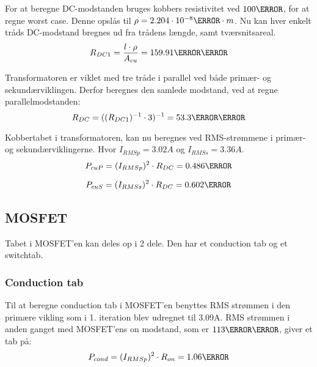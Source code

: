 For at beregne DC-modstanden bruges kobbers resistivitet ved $100\degreeCelsius$, for at regne worst case. Denne opslås til $\rho=2.204\cdot 10^{-8}\ohm \cdot m$. Nu kan hver enkelt tråds DC-modstand bregnes ud fra trådens længde, samt tværsnitsareal.
\begin{equation} \label{dc1-modstand}
R_{DC1} = \frac{l \cdot \rho}{A_{cu}} = 159.91\milli\ohm
\end{equation}

Transformatoren er viklet med tre tråde i parallel ved både primær- og sekundærviklingen. Derfor beregnes den samlede modstand, ved at regne parallelmodstanden:
\begin{equation} \label{dc-modstand}
R_{DC} = ((R_{DC1})^{-1} \cdot 3)^{-1} = 53.3\milli\ohm
\end{equation}

Kobbertabet i transformatoren, kan nu beregnes ved RMS-strømmene i primær- og sekundærviklingerne. Hvor $I_{RMSp} = 3.02A$ og $I_{RMSs} = 3.36A$.
\begin{equation} \label{dc-tab-pri}
P_{cuP} = (I_{RMSp})^2 \cdot R_{DC} = 0.486\watt
\end{equation}

\begin{equation} \label{dc-tab-sek}
P_{cuS} = (I_{RMSs})^2 \cdot R_{DC} = 0.602\watt
\end{equation}

\subsection{MOSFET}
Tabet i MOSFET'en kan deles op i 2 dele. Den har et conduction tab og et switchtab. 

\subsubsection{Conduction tab}
Til at beregne conduction tab i MOSFET'en benyttes RMS strømmen i den primære vikling som i 1. iteration blev udregnet til 3.09A. RMS strømmen i anden ganget med MOSFET'ens on modstand, som er $113\milli \ohm$, giver et tab på:
\begin{equation} \label{P_con}
P_{cond} = (I_{RMSp})^2 \cdot R_{on} = 1.06\watt
\end{equation}

